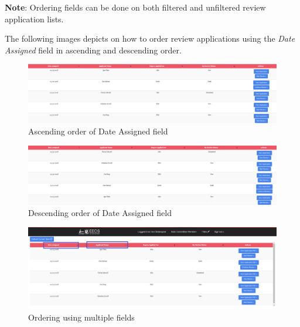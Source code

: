 \documentclass[fontsize=12pt,paper=letter,twoside]{scrartcl}
\begin{document}
\bigskip
\noindent \textbf{Note}: Ordering fields can be done on both filtered and unfiltered review application lists.

\bigskip
\noindent The following images depicts on how to order review applications using the \emph{Date Assigned} field in ascending and descending order.

\begin{figure}[!htb]
\begin{center}
\includegraphics[width=.99\textwidth]{images/order_ascending.png}
\end{center}
\caption{Ascending order of Date Assigned field}
\label{fig:order_ascending}
\end{figure}

\begin{figure}[!htb]
\begin{center}
\includegraphics[width=.99\textwidth]{images/order_descending.png}
\end{center}
\caption{Descending order of Date Assigned field}
\label{fig:order_descending}
\end{figure}

\newpage

\begin{figure}[!htb]
\begin{center}
\includegraphics[width=.99\textwidth]{images/multiple_order.png}
\end{center}
\caption{Ordering using multiple fields}
\label{fig:multiple_order}
\end{figure}
\end{document}

